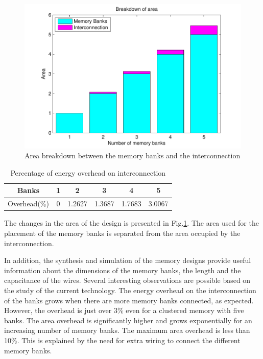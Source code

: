  \begin{figure}
 \centering
 \includegraphics[width = \textwidth]{E/area.pdf}
  \caption{Area breakdown between the memory banks and the interconnection}
 \label{fig:areaE}
 \end{figure}
 
 \begin{table}[t!]
\caption{Percentage of energy overhead on interconnection}
\label{tab:overhead}
\centering
\begin{tabular}{|c|c|c|c|c|c|}
\hline 
Banks & 1 & 2 & 3 & 4 & 5 \\
\hline 
Overhead(\%) & 0	&	1.2627 & 1.3687 & 1.7683 & 3.0067 \\ 
 \hline 
 \end{tabular} 
\end{table} 
 
The changes in the area of the design is presented in Fig.\ref{fig:areaE}.
The area used for the placement of the memory banks is separated from the area occupied by the interconnection.
  
In addition, the synthesis and simulation of the memory designs provide useful information about the dimensions of the memory banks, the length and the capacitance of the wires.
Several interesting observations are possible based on the study of the current technology.
The energy overhead on the interconnection of the banks grows when there are more memory banks connected, as expected.
However, the overhead is just over 3\% even for a clustered memory with five banks. 
The area overhead is significantly higher and grows exponentially for an increasing number of memory banks.  
The maximum area overhead is less than 10\%.
This is explained by the need for extra wiring to connect the different memory banks.


